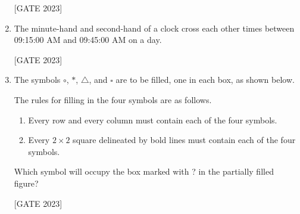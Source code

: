 \documentclass[journal,12pt,onecolumn]{IEEEtran}
\theoremstyle{remark}
\begin{document}
\begin{enumerate}
\hfill{[GATE 2023]}\begin{enumerate}

\end{enumerate}
\item The minute-hand and second-hand of a clock cross each other \underline{\hspace{1.5cm}} times between 09:15:00 AM and 09:45:00 AM on a day.


\hfill{[GATE 2023]}\begin{enumerate}
\end{enumerate}

\item The symbols $ \circ $, $ \ast $, $ \triangle $, and $ \square $ are to be filled, one in each box, as shown below.

The rules for filling in the four symbols are as follows.

\begin{enumerate}
    \item Every row and every column must contain each of the four symbols.
    \item Every $2 \times 2$ square delineated by bold lines must contain each of the four symbols.
\end{enumerate}

 Which symbol will occupy the box marked with ? in the partially filled figure?


\hfill{[GATE 2023]}\begin{enumerate}

\end{enumerate}


\end{enumerate}
\end{document}
